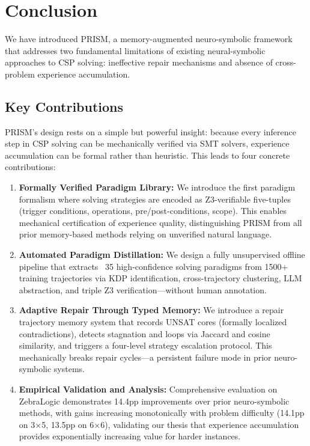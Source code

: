 
\section{Conclusion}

We have introduced PRISM, a memory-augmented neuro-symbolic framework that addresses two fundamental limitations of existing neural-symbolic approaches to CSP solving: ineffective repair mechanisms and absence of cross-problem experience accumulation.

\subsection{Key Contributions}

PRISM's design rests on a simple but powerful insight: because every inference step in CSP solving can be mechanically verified via SMT solvers, experience accumulation can be formal rather than heuristic. This leads to four concrete contributions:

\begin{enumerate}
    \item \textbf{Formally Verified Paradigm Library:} We introduce the first paradigm formalism where solving strategies are encoded as Z3-verifiable five-tuples (trigger conditions, operations, pre/post-conditions, scope). This enables mechanical certification of experience quality, distinguishing PRISM from all prior memory-based methods relying on unverified natural language.

    \item \textbf{Automated Paradigm Distillation:} We design a fully unsupervised offline pipeline that extracts ~35 high-confidence solving paradigms from 1500+ training trajectories via KDP identification, cross-trajectory clustering, LLM abstraction, and triple Z3 verification—without human annotation.

    \item \textbf{Adaptive Repair Through Typed Memory:} We introduce a repair trajectory memory system that records UNSAT cores (formally localized contradictions), detects stagnation and loops via Jaccard and cosine similarity, and triggers a four-level strategy escalation protocol. This mechanically breaks repair cycles—a persistent failure mode in prior neuro-symbolic systems.

    \item \textbf{Empirical Validation and Analysis:} Comprehensive evaluation on ZebraLogic demonstrates 14.4pp improvements over prior neuro-symbolic methods, with gains increasing monotonically with problem difficulty (14.1pp on 3×5, 13.5pp on 6×6), validating our thesis that experience accumulation provides exponentially increasing value for harder instances.
\end{enumerate}

